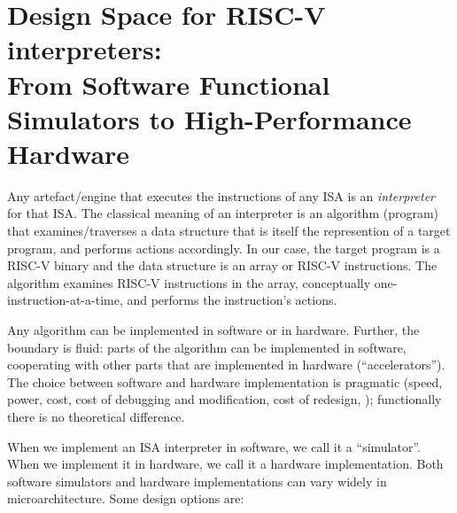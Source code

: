 

\chapter{Design Space for RISC-V interpreters: \\
{From Software Functional Simulators to High-Performance Hardware}}


\setcounter{page}{1}
\renewcommand{\thepage}{\arabic{chapter}-\arabic{page}}

\label{ch_RISCV_Design_Space}


Any artefact/engine that executes the instructions of any ISA is an
\emph{interpreter} for that ISA. The classical meaning of an
interpreter is an algorithm (program) that examines/traverses a data
structure that is itself the represention of a target program, and
performs actions accordingly.  In our case, the target program is a
RISC-V binary and the data structure is an array or RISC-V
instructions.  The algorithm examines RISC-V instructions in the
array, conceptually one-instruction-at-a-time, and performs the
instruction's actions.

Any algorithm can be implemented in software or in hardware.  Further,
the boundary is fluid: parts of the algorithm can be implemented in
software, cooperating with other parts that are implemented in
hardware (``accelerators'').  The choice between software and hardware
implementation is pragmatic (speed, power, cost, cost of debugging and
modification, cost of redesign, {\etc}); functionally there is no
theoretical difference.

When we implement an ISA interpreter in software, we call it a
``simulator''.  When we implement it in hardware, we call it a
hardware implementation.  Both software simulators and hardware
implementations can vary widely in microarchitecture.  Some design
options are:

